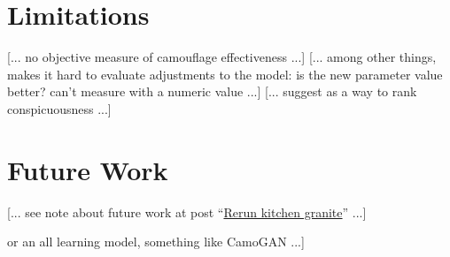\documentclass[sigconf]{acmart}
\begin{document}
\section{Limitations}
[... no objective measure of camouflage effectiveness ...]
[... among other things, makes it hard to evaluate adjustments to the model: is the new parameter value better? can't measure with a numeric value ...]
[... suggest  \cite{lv_cod_2022} as a way to rank conspicuousness ...]
\par
[... all results are hand selected, “cherry picked” ...] 
\par
[... in email to Ken I wrote: \textit{The aspect of my project I'm unsure how to approach is lack of rigor. My evaluations are all subjective. It comes down to “we can see that the effectiveness of the camouflage clearly increases during the simulation.”}]
\par
[... inherently 2d ...]
\par
[... texture synthesis lacks genetic or biological plausibility ...]
\par


\section{Future Work}
[... see note about future work at post “\href{https://cwreynolds.github.io/TexSyn/#20221106}{Rerun kitchen granite}” ...]
\par
[... propose a crowd sourced user study of camouflage quality ... could be based on time to find ... like the interactive web games of \href{https://www.visual-ecology.com/2020/10/06/martin-stevens/}{Martin Stevens} nuthatch egg? ...] 
\par
[... currently a “mixed paradigm” model using both evolution and learning ... (maybe note these typically co-occur in nature  \cite{valiant_probably_2013}) ... propose an all-evolution model with evolved detectors for predators [... perhaps like the work of \href{https://people.wgtn.ac.nz/Mengjie.Zhang}{Mengjie Zhang} or his students like \href{https://yingbi92.github.io/homepage/}{Ying Bi}? find a representative paper to cite, perhaps coauthored by them ...] or an all learning model, something like CamoGAN \cite{talas_camogan_2020} ...]
\par


\end{document}
